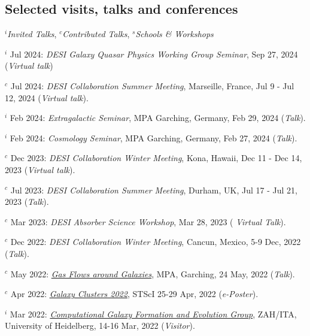 \documentclass[12pt,letterpaper]{article}
\begin{document}
\subsection{Selected visits, talks and conferences}
$^i$\emph{Invited Talks}, $^c$\emph{Contributed Talks}, $^s$\emph{Schools \& Workshops}
\begin{list}{}{\cvlist}
\item $^i$ Jul 2024:  \emph{DESI Galaxy Quasar Physics Working Group Seminar}, Sep 27, 2024 (\textit{Virtual talk})
\item $^c$ Jul 2024:  \emph{DESI Collaboration Summer Meeting}, Marseille, France,   Jul 9 - Jul 12, 2024 (\textit{Virtual talk}).
\item $^i$ Feb 2024:  \emph{Extragalactic Seminar}, MPA Garching, Germany, Feb 29, 2024 (\textit{Talk}).
\item $^i$ Feb 2024:  \emph{Cosmology Seminar}, MPA Garching, Germany, Feb 27, 2024 (\textit{Talk}).
\item $^c$ Dec 2023:  \emph{DESI Collaboration Winter Meeting}, Kona, Hawaii, Dec 11 - Dec 14, 2023 (\textit{Virtual talk}).
\item $^c$ Jul 2023:  \emph{DESI Collaboration Summer Meeting}, Durham, UK, Jul 17 - Jul 21, 2023 (\textit{Talk}).
\item $^c$ Mar 2023:  \emph{DESI Absorber Science Workshop}, Mar 28, 2023 (\textit{ Virtual Talk}).
\item $^c$ Dec 2022:  \emph{DESI Collaboration Winter Meeting}, Cancun, Mexico, 5-9 Dec, 2022 (\textit{Talk}).
\item $^c$ May 2022:  \emph{\href{https://indico.ph.tum.de/event/7018/}{Gas Flows around Galaxies}}, MPA, Garching, 24 May, 2022 (\textit{Talk}).
\item $^c$ Apr 2022:  \emph{\href{https://www.stsci.edu/contents/events/stsci/2022/april/galaxy-clusters-2022-challenging-our-cosmological-perspectives}{Galaxy Clusters 2022}}, STScI 25-29 Apr, 2022 (\textit{e-Poster}).
\item $^i$ Mar 2022:  \emph{\href{https://zah.uni-heidelberg.de/research-groups\#c2659}{Computational Galaxy Formation and Evolution Group}}, ZAH/ITA, University of Heidelberg, 14-16 Mar, 2022 (\textit{Visitor}).

\end{list}
\end{document}
